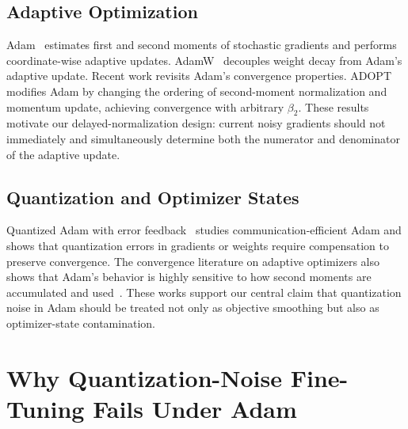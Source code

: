 \documentclass[journal]{IEEEtran}
\begin{document}
\subsection{Adaptive Optimization}
Adam~\cite{kingma2015adam} estimates first and second moments of stochastic gradients and performs coordinate-wise adaptive updates. AdamW~\cite{loshchilov2019adamw} decouples weight decay from Adam's adaptive update. Recent work revisits Adam's convergence properties. ADOPT~\cite{taniguchi2024adopt} modifies Adam by changing the ordering of second-moment normalization and momentum update, achieving convergence with arbitrary $\beta_2$. These results motivate our delayed-normalization design: current noisy gradients should not immediately and simultaneously determine both the numerator and denominator of the adaptive update.

\subsection{Quantization and Optimizer States}
Quantized Adam with error feedback~\cite{chen2020qadam} studies communication-efficient Adam and shows that quantization errors in gradients or weights require compensation to preserve convergence. The convergence literature on adaptive optimizers also shows that Adam's behavior is highly sensitive to how second moments are accumulated and used~\cite{reddi2018adam,taniguchi2024adopt}. These works support our central claim that quantization noise in Adam should be treated not only as objective smoothing but also as optimizer-state contamination.

\section{Why Quantization-Noise Fine-Tuning Fails Under Adam}
\end{document}
